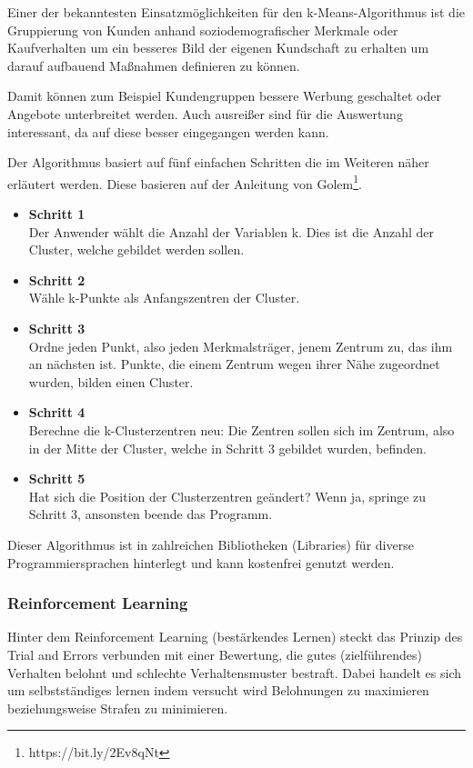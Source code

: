 Einer der bekanntesten Einsatzmöglichkeiten für den k-Means-Algorithmus ist die Gruppierung von Kunden anhand
soziodemografischer Merkmale oder Kaufverhalten um ein besseres Bild der eigenen Kundschaft zu erhalten um darauf
aufbauend Maßnahmen definieren zu können.

Damit können zum Beispiel Kundengruppen bessere Werbung geschaltet oder Angebote unterbreitet werden. Auch ausreißer
sind für die Auswertung interessant, da auf diese besser eingegangen werden kann.

Der Algorithmus basiert auf fünf einfachen Schritten die im Weiteren näher erläutert werden. Diese basieren auf der
Anleitung von Golem\footnote{https://bit.ly/2Ev8qNt}.

\begin{itemize}
    \item \textbf{Schritt 1} \\
    Der Anwender wählt die Anzahl der Variablen k. Dies ist die Anzahl der Cluster, welche gebildet werden sollen.
    \item \textbf{Schritt 2} \\
    Wähle k-Punkte als Anfangszentren der Cluster.
    \item \textbf{Schritt 3} \\
    Ordne jeden Punkt, also jeden Merkmalsträger, jenem Zentrum zu, das ihm an nächsten ist. Punkte, die einem Zentrum
    wegen ihrer Nähe zugeordnet wurden, bilden einen Cluster.
    \item \textbf{Schritt 4} \\
    Berechne die k-Clusterzentren neu: Die Zentren sollen sich im Zentrum, also in der Mitte der Cluster, welche in
    Schritt 3 gebildet wurden, befinden.
    \item \textbf{Schritt 5} \\
    Hat sich die Position der Clusterzentren geändert? Wenn ja, springe zu Schritt 3, ansonsten beende das Programm.
\end{itemize}

Dieser Algorithmus ist in zahlreichen Bibliotheken (Libraries) für diverse Programmiersprachen hinterlegt und kann
kostenfrei genutzt werden.

\subsubsection{Reinforcement Learning}
Hinter dem Reinforcement Learning (bestärkendes Lernen) steckt das Prinzip des Trial and Errors verbunden mit einer
Bewertung, die gutes (zielführendes) Verhalten belohnt und schlechte Verhaltensmuster bestraft. Dabei handelt es sich
um selbstständiges lernen indem versucht wird Belohnungen zu maximieren beziehungsweise Strafen zu minimieren.

